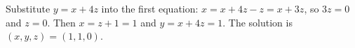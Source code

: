 Substitute $y=x+4z$ into the first equation: $x=x+4z-z=x+3z$, so $3z=0$ and $z=0$. Then $x=z+1=1$ and $y=x+4z=1$. The solution is $\boxed{(x,y,z)=(1,1,0)}$.
